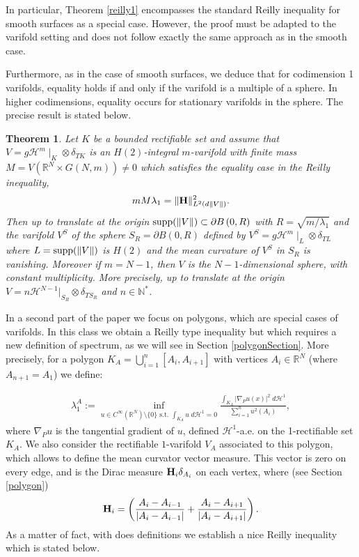 \documentclass[12pt,english]{smfart} %
\newtheorem{theorem}{Theorem}[section]
\theoremstyle{remark}
\newcommand{\R}{\mathbb{R}}
\newcommand{\HH}{\mathcal{H}} %
\newcommand{\Hm}{{\bf H}}
\begin{document}
In particular, Theorem \ref{reilly1} encompasses the standard Reilly inequality for smooth surfaces as a special case. However, the proof must be adapted to the varifold setting and does not follow exactly the same approach as in the smooth case.

Furthermore, as in the case of smooth surfaces, we deduce that for codimension 1 varifolds, equality holds if and only if the varifold is a multiple of a sphere. In higher codimensions, equality occurs for stationary varifolds in the sphere. The precise result is stated below.
 
\medskip\begin{theorem}\label{equalityH2} Let $K$ be a bounded rectifiable set and assume that $V=g\HH^m\mid_{K}\otimes\delta_{TK}$ is an $H(2)$-integral $m$-varifold with finite mass  $M= V(\mathbb{R}^N\times G(N,m))\not = 0$ which satisfies the equality case in the Reilly inequality, 
 \begin{eqnarray}
mM \lambda_1 = \|{\bf H} \|^2_{L^2(d\|V\|)}. \label{ineqReq}
\end{eqnarray}
Then up to translate at the origin ${\rm supp}(\|V\|) \subset \partial B\left(0,R\right)$ with $R=\sqrt{m/\lambda_1}$ and the varifold $V^S$ of the sphere $S_{R}=\partial B\left(0,R\right)$ defined by $V^S=g\HH^m\mid_{L}\otimes\delta_{TL}$ where $L={\rm supp}(\|V\|)$ is $H(2)$ and the mean curvature of $V^S$ in $S_R$ is vanishing. Moreover if $m=N-1$, then $V$ is the  $N-1$-dimensional sphere, with constant multiplicity. More precisely, up to translate at the origin  $V=n\mathcal{H}^{N-1}|_{S_R}\otimes\delta_{TS_R}$  and $n\in \mathbb{N}^*$. 
\end{theorem} 


In a second part of the paper we  focus on polygons, which are special cases of varifolds. In this class we obtain a Reilly type inequality but which  requires a new definition of spectrum,  as we will see in Section \ref{polygonSection}.  More precisely, for a polygon  $K_A=\bigcup_{i=1}^n [A_i,A_{i+1}]$ with vertices $A_i\in \R^N$ (where $A_{n+1}=A_1$)  we define:

 \begin{eqnarray}
 \lambda_1^A:=\inf_{u \in C^\infty(\mathbb{R}^N) \setminus \{0\} \text{ s.t. } \int_{K_A} u \; d \mathcal{H}^1=0} \frac{\int_{K_A} |\nabla_P u(x)|^2 \;d \mathcal{H}^1}{\sum_{i=1}^{n} u^2(A_i)}, \label{lambdaPintro}
 \end{eqnarray}
where $\nabla_P u$ is the tangential gradient of $u$, defined $\mathcal{H}^1$-a.e. on the 1-rectifiable set $K_A$. We also consider the rectifiable $1$-varifold $V_A$  associated to this polygon, which allows to define the mean curvator vector measure. This vector is zero on every edge, and is the Dirac measure $\Hm_i \delta_{A_i}$ on each vertex, where  (see Section \ref{polygon})
$$\Hm_i= \left(\frac{A_{i}-A_{i-1}}{|A_i-A_{i-1}|}+ \frac{A_{i}-A_{i+1}}{|A_i-A_{i+1}|}\right).$$
As a matter of fact, with does definitions we establish a nice Reilly inequality which is stated below.
\end{document}
